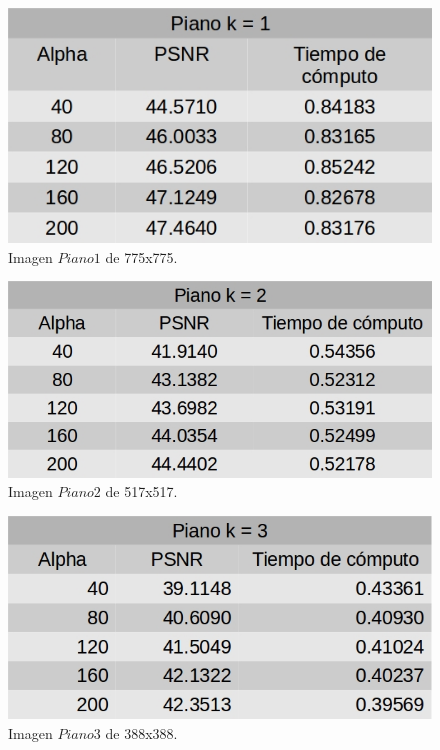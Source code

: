 \documentclass[a4paper]{article}
\begin{document}
    \begin{figure}[H]
    \centering
    \includegraphics[scale=0.4]{imagenes/piano1.jpg}
    \caption{Imagen $Piano1$ de 775x775.}
	\label{piano1}
    \end{figure}
    
    
    \begin{figure}[H]
    \centering
    \includegraphics[scale=0.4]{imagenes/piano2.jpg}
    \caption{Imagen $Piano2$ de 517x517.}
	\label{piano2}
    \end{figure}
    
     \begin{figure}[H]
    \centering
    \includegraphics[scale=0.4]{imagenes/piano3.jpg}
    \caption{Imagen $Piano3$ de 388x388.}
	\label{piano3}
    \end{figure}
    
\end{document}
